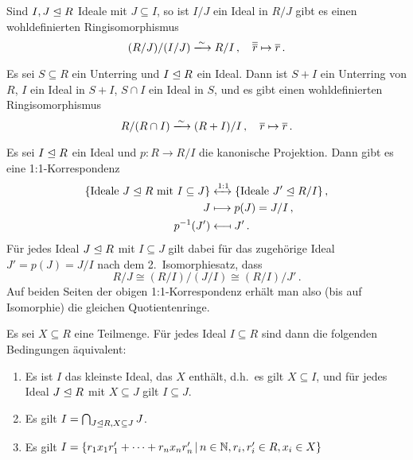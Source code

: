 \begin{corollary}[2.\ Isomorphiesatz]
  Sind $I, J \mathrel{\trianglelefteq} R$ Ideale mit $J \subseteq I$, so ist $I/J$ ein Ideal in $R/J$ gibt es einen wohldefinierten Ringisomorphismus
  \[
                            (R/J)/(I/J)
    \xlongrightarrow{\sim}  R/I \,,
    \quad                   \class{\class{r}}
    \mapsto                 \class{r} \,.
  \]

\end{corollary}

\begin{corollary}[3.\ Isomorphiesatz]
  Es sei $S \subseteq R$ ein Unterring und $I \mathrel{\trianglelefteq} R$ ein Ideal.
  Dann ist $S + I$ ein Unterring von $R$, $I$ ein Ideal in $S + I$, $S \cap I$ ein Ideal in $S$, und es gibt einen wohldefinierten Ringisomorphismus
  \[
                            R/(R \cap I)
    \xlongrightarrow{\sim}  (R + I)/I \,,
    \quad                   \class{r}
    \mapsto                 \class{r} \,.
  \]
\end{corollary}

\begin{lemma}
  \label{lemma: correspondence between ideals}
  Es sei $I \mathrel{\trianglelefteq} R$ ein Ideal und $p \colon R \to R/I$ die kanonische Projektion.
  Dann gibt es eine 1:1-Korrespondenz
  \begin{align*}
    \{ \text{Ideale $J \mathrel{\trianglelefteq} R$ mit $I \subseteq J$} \}
    &\xleftrightarrow{1:1}
    \{ \text{Ideale $J' \mathrel{\trianglelefteq} R/I$} \} \,,
    \\
    J
    &\longmapsto
    p(J)
    =
    J/I \,,
    \\
    p^{-1}(J')
    &\longmapsfrom
    J' \,.
  \end{align*}
  Für jedes Ideal $J \mathrel{\trianglelefteq} R$ mit $I \subseteq J$ gilt dabei für das zugehörige Ideal $J' = p(J) = J/I$ nach dem 2.\ Isomorphiesatz, dass
  \[
          R/J
    \cong (R/I)/(J/I)
    \cong (R/I)/J' \,.
  \]
  Auf beiden Seiten der obigen 1:1-Korrespondenz erhält man also \textup(bis auf Isomorphie\textup) die gleichen Quotientenringe.
\end{lemma}

Es sei $X \subseteq R$ eine Teilmenge.
Für jedes Ideal $I \subseteq R$ sind dann die folgenden Bedingungen äquivalent:

\begin{enumerate}
  \item
    Es ist $I$ das kleinste Ideal, das $X$ enthält, d.h.\ es gilt $X \subseteq I$, und für jedes Ideal $J \mathrel{\trianglelefteq} R$ mit $X \subseteq J$ gilt $I \subseteq J$.
  \item
    Es gilt $I = \bigcap_{J \mathrel{\trianglelefteq} R, X \subseteq J} J$.
  \item
    Es gilt
    $
        I
      = \{
          r_1 x_1 r'_1 + \dotsb + r_n x_n r'_n
        \suchthat
          n \in \Natural,
          r_i, r'_i \in R,
          x_i \in X
        \}
    $
\end{enumerate}

